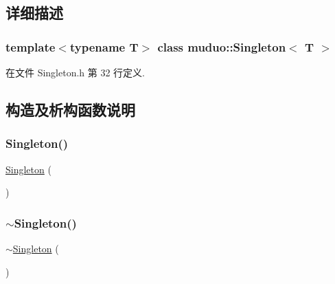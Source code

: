 \subsection{详细描述}
\subsubsection*{template$<$typename T$>$\newline
class muduo\+::\+Singleton$<$ T $>$}



在文件 Singleton.\+h 第 32 行定义.



\subsection{构造及析构函数说明}
\mbox{\label{classmuduo_1_1Singleton_a44b764c599fe2b905e668fe6e69d66ec}} 
\subsubsection{\texorpdfstring{Singleton()}{Singleton()}}
{\footnotesize\ttfamily \hyperlink{classmuduo_1_1Singleton}{Singleton} (\begin{DoxyParamCaption}{ }\end{DoxyParamCaption})\hspace{0.3cm}{\ttfamily [delete]}}

\mbox{\label{classmuduo_1_1Singleton_a78c68a8e40364e9035e676fa558d3796}} 
\subsubsection{\texorpdfstring{$\sim$\+Singleton()}{~Singleton()}}
{\footnotesize\ttfamily $\sim$\hyperlink{classmuduo_1_1Singleton}{Singleton} (\begin{DoxyParamCaption}{ }\end{DoxyParamCaption})\hspace{0.3cm}{\ttfamily [delete]}}




